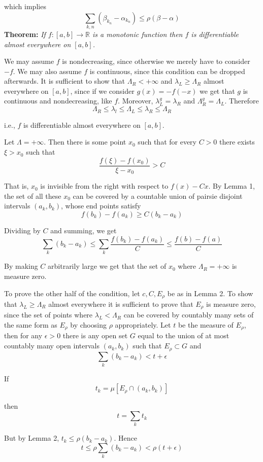 \documentclass[11pt]{article}
\begin{document}
\begin{enumerate}
which implies
\[
\sum_{k,n} (\beta_{k_n} - \alpha_{k_n}) \leq \rho(\beta - \alpha)
\]
\newpage
\textbf{Theorem:} \emph{If $f: [a,b] \rightarrow \mathbb{R}$ is a monotonic function then $f$ is differentiable almost everywhere on $[a,b]$.}

We may assume $f$ is nondecreasing, since otherwise we merely have to consider $-f$.  We may also assume $f$ is continuous, since this condition can be dropped afterwards.  It is sufficient to show that $\Lambda_R < +\infty$ and $\lambda_L \geq \Lambda_R$ almost everywhere on $[a,b]$, since if we consider $g(x)=-f(-x)$ we get that $g$ is continuous and nondecreasing, like $f$.  Moreover, $\lambda^g_L = \lambda_R$ and $\Lambda^g_R = \Lambda_L$.  Therefore
\[
\Lambda_R \leq \lambda_l \leq \Lambda_L \leq \lambda_R \leq \Lambda_R
\]

i.e., $f$ is differentiable almost everywhere on $[a,b]$.

Let $\Lambda = +\infty$.  Then there is some point $x_0$ such that for every $C>0$ there exists $\xi > x_0$ such that
\[
\frac{f(\xi) - f(x_0)}{\xi - x_0} > C
\]

That is, $x_0$ is invisible from the right with respect to $f(x) - Cx$.  By Lemma 1, the set of all these $x_0$ can be covered by a countable union of pairsie disjoint intervals $(a_k, b_k)$, whose end points satisfy
\[
f(b_k) - f(a_k) \geq C(b_k - a_k)
\]

Dividing by $C$ and summing, we get
\[
\sum_k (b_k - a_k) \leq \sum_k \frac{f(b_k) - f(a_k)}{C} \leq \frac{f(b) - f(a)}{C}
\]

By making $C$ arbitrarily large we get that the set of $x_0$ where $\Lambda_R = +\infty$ is measure zero.

To prove the other half of the condition, let $c,C,E_\rho$ be as in Lemma 2.  To show that $\lambda_L \geq \Lambda_R$ almost everywhere it is sufficient to prove that $E_\rho$ is measure zero, since the set of points where $\lambda_L < \Lambda_R$ can be covered by countably many sets of the same form as $E_\rho$ by choosing $\rho$ appropriately.  Let $t$ be the measure of $E_\rho$, then for any $\epsilon > 0$ there is any open set $G$ equal to the union of at most countably many open intervals $(a_k,b_k)$ such that $E_\rho \subset G$ and
\[
\sum_k (b_k - a_k) < t + \epsilon
\]

If
\[
t_k = \mu[E_\rho \cap (a_k,b_k)]
\]

then
\[
t = \sum_k t_k
\]

But by Lemma 2, $t_k \leq \rho(b_k-a_k)$.  Hence
\[
t \leq \rho\sum_k (b_k-a_k) < \rho(t+\epsilon)
\]


\end{enumerate}
\end{document}
